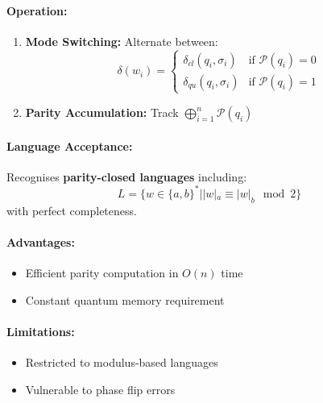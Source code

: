 \paragraph{Operation:}
\begin{enumerate}
    \item \textbf{Mode Switching:} Alternate between:
    \[
    \delta(w_i) = \begin{cases}
        \delta_{cl}(q_i, \sigma_i) & \text{if } \mathcal{P}(q_i) = 0 \\
        \delta_{qu}(q_i, \sigma_i) & \text{if } \mathcal{P}(q_i) = 1
    \end{cases}
    \]
    \item \textbf{Parity Accumulation:} Track $\bigoplus_{i=1}^n \mathcal{P}(q_i)$
\end{enumerate}

\paragraph{Language Acceptance:}
Recognises \textbf{parity-closed languages} including:
\[
L = \{w \in \{a,b\}^* | |w|_a \equiv |w|_b \mod 2\} 
\]
\cite{hirvensalo2012quantum}
with perfect completeness.

\paragraph{Advantages:}
\begin{itemize}
    \item Efficient parity computation in $O(n)$ time
    \item Constant quantum memory requirement \cite{yakaryilmaz2011}
\end{itemize}

\paragraph{Limitations:}
\begin{itemize}
    \item Restricted to modulus-based languages
    \item Vulnerable to phase flip errors
\end{itemize}

\subsubsection{}
\label{subsec:bcqfa}

